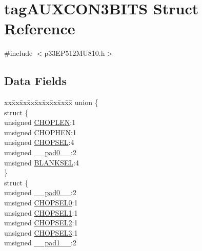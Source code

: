 \hypertarget{structtag_a_u_x_c_o_n3_b_i_t_s}{}\section{tag\+A\+U\+X\+C\+O\+N3\+B\+I\+TS Struct Reference}
\label{structtag_a_u_x_c_o_n3_b_i_t_s}


{\ttfamily \#include $<$p33\+E\+P512\+M\+U810.\+h$>$}

\subsection*{Data Fields}
\begin{DoxyCompactItemize}
\item 
\begin{tabbing}
xx\=xx\=xx\=xx\=xx\=xx\=xx\=xx\=xx\=\kill
union \{\\
\>struct \{\\
\>\>unsigned \hyperlink{structtag_a_u_x_c_o_n3_b_i_t_s_a3ef61325b83d3685e2364392dd43dd06}{CHOPLEN}:1\\
\>\>unsigned \hyperlink{structtag_a_u_x_c_o_n3_b_i_t_s_a38243e11a4372e45b55166fcec4322fa}{CHOPHEN}:1\\
\>\>unsigned \hyperlink{structtag_a_u_x_c_o_n3_b_i_t_s_aafc704d0a50b4ba0c019d33514cb7782}{CHOPSEL}:4\\
\>\>unsigned \hyperlink{structtag_a_u_x_c_o_n3_b_i_t_s_adf71f3d8410c1f1dbbc96680a92c49af}{\_\_pad0\_\_}:2\\
\>\>unsigned \hyperlink{structtag_a_u_x_c_o_n3_b_i_t_s_a16dd126500ffc8232d3b8e619c4406a2}{BLANKSEL}:4\\
\>\} \\
\>struct \{\\
\>\>unsigned \hyperlink{structtag_a_u_x_c_o_n3_b_i_t_s_adf71f3d8410c1f1dbbc96680a92c49af}{\_\_pad0\_\_}:2\\
\>\>unsigned \hyperlink{structtag_a_u_x_c_o_n3_b_i_t_s_acc4daaf21ff4590b40d3f25dad388167}{CHOPSEL0}:1\\
\>\>unsigned \hyperlink{structtag_a_u_x_c_o_n3_b_i_t_s_a5be3cb702a6c27dd28ee2f7bb142c88c}{CHOPSEL1}:1\\
\>\>unsigned \hyperlink{structtag_a_u_x_c_o_n3_b_i_t_s_ae9a19a5d1e40ae671a2b05fa09e77c10}{CHOPSEL2}:1\\
\>\>unsigned \hyperlink{structtag_a_u_x_c_o_n3_b_i_t_s_a6bcb1f80b40842c9ebd3c9d76d4c196f}{CHOPSEL3}:1\\
\>\>unsigned \hyperlink{structtag_a_u_x_c_o_n3_b_i_t_s_acaf2d0924a107ec6e8d2e31febaf66f9}{\_\_pad1\_\_}:2\\

\end{tabbing}
\end{DoxyCompactItemize}
